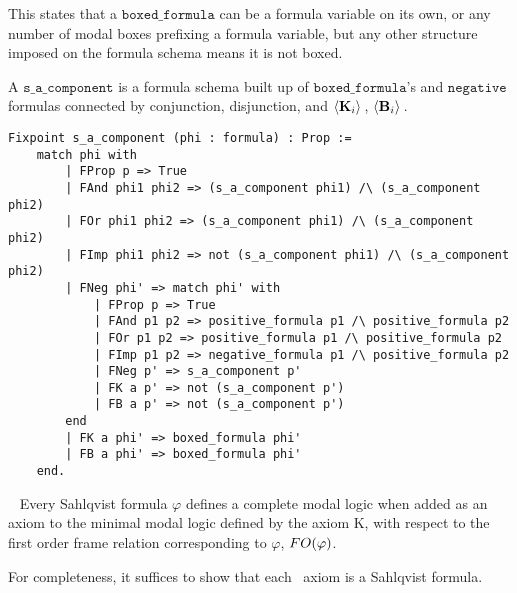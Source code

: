 This states that a $\mathtt{boxed\_formula}$ can be a formula variable on its own, or any number of modal boxes prefixing a formula variable, but any other structure imposed on the formula schema means it is not boxed.

A $\mathtt{s\_a\_component}$ is a formula schema built up of $\mathtt{boxed\_formula}$'s and $\mathtt{negative}$ formulas connected by conjunction, disjunction, and $\langle \mathbf{K}_{i} \rangle\,$, $\langle \mathbf{B}_{i} \rangle\,$.

\begin{tcolorbox}
	\begin{lstlisting}[language=Coq]
Fixpoint s_a_component (phi : formula) : Prop :=
	match phi with
		| FProp p => True
		| FAnd phi1 phi2 => (s_a_component phi1) /\ (s_a_component phi2)
		| FOr phi1 phi2 => (s_a_component phi1) /\ (s_a_component phi2)
		| FImp phi1 phi2 => not (s_a_component phi1) /\ (s_a_component phi2)
		| FNeg phi' => match phi' with
			| FProp p => True
			| FAnd p1 p2 => positive_formula p1 /\ positive_formula p2
			| FOr p1 p2 => positive_formula p1 /\ positive_formula p2
			| FImp p1 p2 => negative_formula p1 /\ positive_formula p2
			| FNeg p' => s_a_component p'
			| FK a p' => not (s_a_component p')
			| FB a p' => not (s_a_component p')
		end
		| FK a phi' => boxed_formula phi'
		| FB a phi' => boxed_formula phi'
	end.
	\end{lstlisting}	
	
\end{tcolorbox}

\begin{theorem}~\label{thm:sahlqvist}
	Every Sahlqvist formula $\varphi$ defines a complete modal logic when added as an axiom to the minimal modal logic defined by the axiom K, with respect to the first order frame relation corresponding to $\varphi$,  $\mathnormal{FO}(\varphi)$.
\end{theorem}

For completeness, it suffices to show that each \DASL\ axiom is a Sahlqvist formula. 


